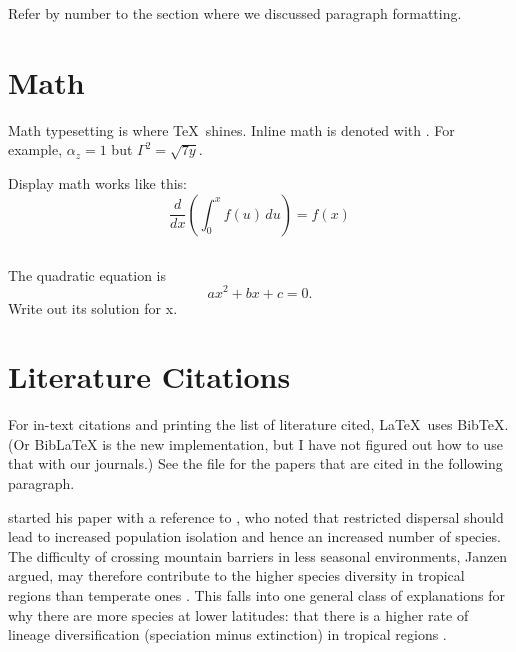 \documentclass{article}
\begin{document}
Refer by number to the section where we discussed paragraph formatting.

\section{Math}
\label{sec:math}

Math typesetting is where \TeX\ shines.
Inline math is denoted with \latexcode{\$}.
For example, $\alpha_z = 1$ but $\Gamma^2 = \sqrt{7 y}$.

Display math works like this:
\begin{equation}
    \frac{d}{dx} \left( \int_{0}^{x} f(u)\, du \right) = f(x)
\label{eq:deriv}
\end{equation}


\subsection{\task}

The quadratic equation is
\begin{equation}
    a x^2 + b x + c = 0.
\label{eq:quadratic}
\end{equation}
Write out its solution for x.

\section{Literature Citations}
\label{sec:literature}

For in-text citations and printing the list of literature cited, \LaTeX\ uses BibTeX.
(Or BibLaTeX is the new implementation, but I have not figured out how to use that with our journals.)
See the  file for the papers that are cited in the following paragraph.

\citet{Janzen1967} started his paper with a reference to \citet{Simpson1964}, who noted that restricted dispersal should lead to increased population isolation and hence an increased number of species.
The difficulty of crossing mountain barriers in less seasonal environments, Janzen argued, may therefore contribute to the higher species diversity in tropical regions than temperate ones \citep{Ghalambor2006}.
This falls into one general class of explanations for why there are more species at lower latitudes: that there is a higher rate of lineage diversification (speciation minus extinction) in tropical regions               \citep{Ricklefs2006, Weir2007, Mittelbach2007}.
\end{document}
